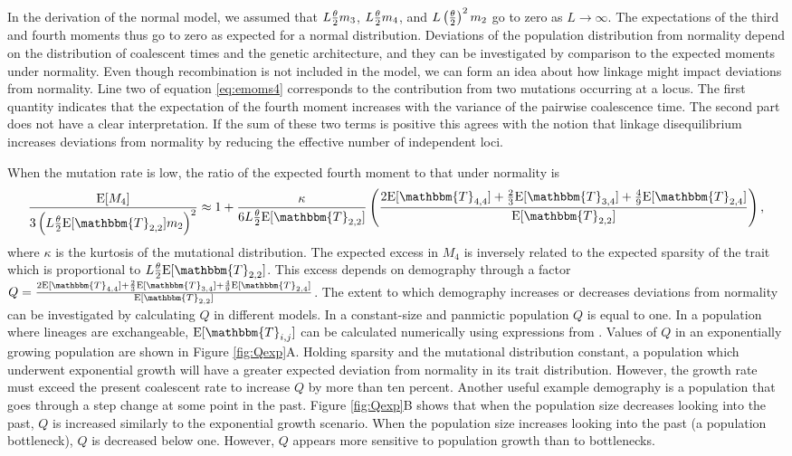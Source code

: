 In the derivation of the normal model, we assumed that $L\frac{\theta}{2} m_3$, $L \frac{\theta}{2} m_4$,
and $L \left( \frac{\theta}{2} \right)^2 m_2$ go to zero as $L\to \infty$. The expectations of
the third and fourth moments thus go to zero as expected for a normal
distribution. Deviations of the population distribution from normality depend on
the distribution of coalescent times and the genetic architecture, and they can
be investigated by comparison to the expected moments under normality. Even
though recombination is not included in the model, we can form an idea about how
linkage might impact deviations from normality. Line two of
equation \eqref{eq:emoms4} corresponds to the contribution from two mutations
occurring at a locus. The first quantity indicates that the expectation of the
fourth moment increases with the variance of the pairwise coalescence time. The
second part does not have a clear interpretation. If the sum of these two terms
is positive this agrees with the notion that linkage disequilibrium increases
deviations from normality by reducing the effective number of independent loci.

When the mutation rate is low, the ratio of the expected fourth moment to that
under normality is
\begin{equation}
  \label{eq:popmom4coal}
  \frac{\E[M_4]}{3\left(L \T \E[\mathbbm{T}_{2,2}] m_2\right)^2} \approx 1 +
  \frac{\kappa}{6 L \T \E[\mathbbm{T}_{2,2}]}\left( \frac{2\E[\mathbbm{T}_{4,4}] +
      \frac{2}{3}\E[\mathbbm{T}_{3,4}] +
      \frac{4}{9}\E[\mathbbm{T}_{2,4}]}{\E[\mathbbm{T}_{2,2}]}\right),
\end{equation}
where $\kappa$ is the kurtosis of the mutational distribution. The expected
excess in $M_4$ is inversely related to the expected sparsity of the trait which
is proportional to $L \T \E[\mathbbm{T}_{2,2}]$. This excess depends on
demography through a factor $Q = \frac{2\E[\mathbbm{T}_{4,4}] +
  \frac{2}{3}\E[\mathbbm{T}_{3,4}] +
  \frac{4}{9}\E[\mathbbm{T}_{2,4}]}{\E[\mathbbm{T}_{2,2}]}$. The extent to which
demography increases or decreases deviations from normality can be investigated
by calculating $Q$ in different models. In a constant-size and panmictic
population $Q$ is equal to one. In a population where lineages are exchangeable,
$\E[\mathbbm{T}_{i,j}]$ can be calculated numerically using expressions from
\citet{Griffiths1998}. Values of $Q$ in an exponentially growing population are
shown in Figure \ref{fig:Qexp}A. Holding sparsity and the mutational
distribution constant, a population which underwent exponential growth will have
a greater expected deviation from normality in its trait distribution. However,
the growth rate must exceed the present coalescent rate to increase $Q$ by more
than ten percent. Another useful example demography is a population that goes
through a step change at some point in the past. Figure \ref{fig:Qexp}B shows
that when the population size decreases looking into the past, $Q$ is increased
similarly to the exponential growth scenario. When the population size increases
looking into the past (a population bottleneck), $Q$ is decreased below one.
However, $Q$ appears more sensitive to population growth than to bottlenecks.

